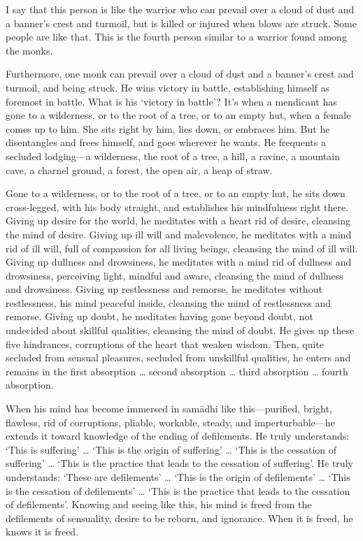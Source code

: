 \documentclass[12pt,openany]{book}%
\begin{document}
I say that this person is like the warrior who can prevail over a cloud of dust and a banner’s crest and turmoil, but is killed or injured when blows are struck. Some people are like that. This is the fourth person similar to a warrior found among the monks. 

Furthermore, one monk can prevail over a cloud of dust and a banner’s crest and turmoil, and being struck. He wins victory in battle, establishing himself as foremost in battle. What is his ‘victory in battle’? It’s when a mendicant has gone to a wilderness, or to the root of a tree, or to an empty hut, when a female comes up to him. She sits right by him, lies down, or embraces him. But he disentangles and frees himself, and goes wherever he wants. He frequents a secluded lodging—a wilderness, the root of a tree, a hill, a ravine, a mountain cave, a charnel ground, a forest, the open air, a heap of straw. 

Gone to a wilderness, or to the root of a tree, or to an empty hut, he sits down cross-legged, with his body straight, and establishes his mindfulness right there. Giving up desire for the world, he meditates with a heart rid of desire, cleansing the mind of desire. Giving up ill will and malevolence, he meditates with a mind rid of ill will, full of compassion for all living beings, cleansing the mind of ill will. Giving up dullness and drowsiness, he meditates with a mind rid of dullness and drowsiness, perceiving light, mindful and aware, cleansing the mind of dullness and drowsiness. Giving up restlessness and remorse, he meditates without restlessness, his mind peaceful inside, cleansing the mind of restlessness and remorse. Giving up doubt, he meditates having gone beyond doubt, not undecided about skillful qualities, cleansing the mind of doubt. He gives up these five hindrances, corruptions of the heart that weaken wisdom. Then, quite secluded from sensual pleasures, secluded from unskillful qualities, he enters and remains in the first absorption … second absorption … third absorption … fourth absorption. 

When his mind has become immersed in \textsanskrit{samādhi} like this—purified, bright, flawless, rid of corruptions, pliable, workable, steady, and imperturbable—he extends it toward knowledge of the ending of defilements. He truly understands: ‘This is suffering’ … ‘This is the origin of suffering’ … ‘This is the cessation of suffering’ … ‘This is the practice that leads to the cessation of suffering’. He truly understands: ‘These are defilements’ … ‘This is the origin of defilements’ … ‘This is the cessation of defilements’ … ‘This is the practice that leads to the cessation of defilements’. Knowing and seeing like this, his mind is freed from the defilements of sensuality, desire to be reborn, and ignorance. When it is freed, he knows it is freed. 
\end{document}
